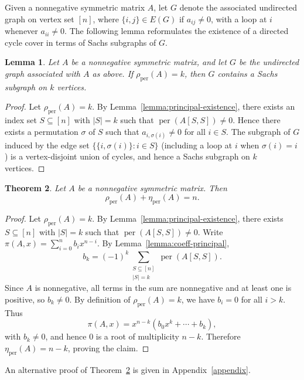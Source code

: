 \documentclass[11pt]{article}
\DeclareMathOperator{\per}{per}
\theoremstyle{plain}
\newtheorem{theorem}{Theorem}[section]   %
\newtheorem{lemma}[theorem]{Lemma}
\theoremstyle{definition}
\theoremstyle{remark}
\begin{document}
Given a nonnegative symmetric matrix \(A\), let \(G\) denote the associated
undirected graph on vertex set \([n]\), where \(\{i,j\}\in E(G)\) if
\(a_{ij}\neq 0\), with a loop at \(i\) whenever \(a_{ii}\neq 0\).
The following lemma reformulates the existence of a directed cycle cover in terms
of Sachs subgraphs of \(G\).

\begin{lemma}\label{perrank_sachsub}
Let \(A\) be a nonnegative symmetric matrix, and let \(G\) be the undirected graph
associated with \(A\) as above. If \(\rho_{\operatorname{per}}(A)=k\), then \(G\)
contains a Sachs subgraph on \(k\) vertices.
\end{lemma}

\begin{proof}
Let \( \rho_{\operatorname{per}}(A)=k \).
By Lemma~\ref{lemma:principal-existence}, there exists an index set
\( S\subseteq[n] \) with \( |S|=k \) such that
\(\per(A[S,S])\neq 0\).
Hence there exists a permutation \(\sigma\) of \(S\) such that
\(a_{i,\sigma(i)}\neq 0\) for all \(i\in S\).
The subgraph of \(G\) induced by the edge set \(\{\{i,\sigma(i)\} : i\in S\}\)
(including a loop at \(i\) when \(\sigma(i)=i\)) is a vertex-disjoint union of
cycles, and hence a Sachs subgraph on \(k\) vertices.
\end{proof}

\begin{theorem}\label{thm:general-prn}
Let \( A \) be a nonnegative symmetric matrix. Then
\[
\rho_{\operatorname{per}}(A) + \eta_{\operatorname{per}}(A) = n.
\]
\end{theorem}

\begin{proof}
Let \(\rho_{\operatorname{per}}(A)=k\).
By Lemma~\ref{lemma:principal-existence}, there exists \(S\subseteq[n]\) with
\(|S|=k\) such that \(\per(A[S,S])\neq 0\).
Write
\(\pi(A,x)=\sum_{i=0}^n b_i x^{n-i}\).
By Lemma~\ref{lemma:coeff-principal},
\[
b_k = (-1)^k \sum_{\substack{S\subseteq[n]\\ |S|=k}} \per(A[S,S]).
\]
Since \(A\) is nonnegative, all terms in the sum are nonnegative and at least one
is positive, so \(b_k\neq 0\).
By definition of \(\rho_{\operatorname{per}}(A)=k\), we have \(b_i=0\) for all
\(i>k\).
Thus
\[
\pi(A,x)=x^{n-k}(b_0x^k+\cdots+b_k),
\]
with \(b_k\neq 0\), and hence \(0\) is a root of multiplicity \(n-k\).
Therefore \(\eta_{\operatorname{per}}(A)=n-k\), proving the claim.
\end{proof}

An alternative proof of Theorem~\ref{thm:general-prn} is given in Appendix~\ref{appendix}.
\end{document}
